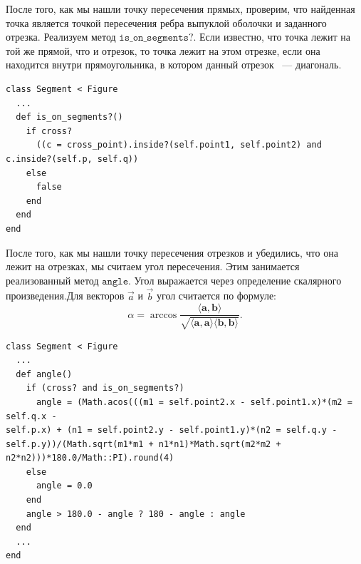 После того, как мы нашли точку пересечения прямых, проверим, что найденная точка является точкой пересечения ребра выпуклой оболочки и заданного отрезка. Реализуем метод $\texttt{is\_on\_segments?}$. Если известно, что точка лежит на той же прямой, что и отрезок, то точка лежит на этом отрезке, если она находится внутри прямоугольника, в котором данный отрезок ~--- диагональ.
\begin{small}
\begin{verbatim}
class Segment < Figure
  ...
  def is_on_segments?()
    if cross? 
      ((c = cross_point).inside?(self.point1, self.point2) and 
c.inside?(self.p, self.q))
    else
      false
    end
  end
end
\end{verbatim}
\end{small}  

После того, как мы нашли точку пересечения отрезков и убедились, что она лежит на отрезках, мы считаем угол пересечения. Этим занимается реализованный метод $\texttt{angle}$. Угол выражается через определение скалярного произведения.Для векторов $ \overrightarrow{a}$ и $ \overrightarrow{b}$ угол считается по формуле: 
$$\alpha = \arccos \frac{\langle\mathbf a, \mathbf b\rangle}{\sqrt{\langle\mathbf a, \mathbf a\rangle\langle\mathbf b,\mathbf b\rangle}}.$$
\begin{small}
\begin{verbatim}
class Segment < Figure
  ...
  def angle()
    if (cross? and is_on_segments?)
      angle = (Math.acos(((m1 = self.point2.x - self.point1.x)*(m2 = self.q.x -
self.p.x) + (n1 = self.point2.y - self.point1.y)*(n2 = self.q.y -
self.p.y))/(Math.sqrt(m1*m1 + n1*n1)*Math.sqrt(m2*m2 +
n2*n2)))*180.0/Math::PI).round(4)
    else
      angle = 0.0
    end
    angle > 180.0 - angle ? 180 - angle : angle
  end
  ...
end
\end{verbatim}
\end{small}
 
